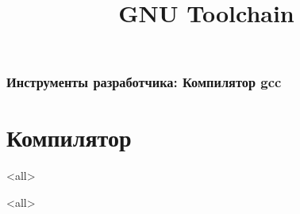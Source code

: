 
\title[toolchain]{GNU Toolchain}




\begin{frame}
	\frametitle{Инструменты разработчика: Компилятор gcc}
	\titlepage
	\vspace{-0.5cm}
	\begin{center}
	\end{center}
\end{frame}

\begin{frame}
	\tableofcontents
\end{frame}



\section{Компилятор}

\mode<all>{}

\mode<all>

